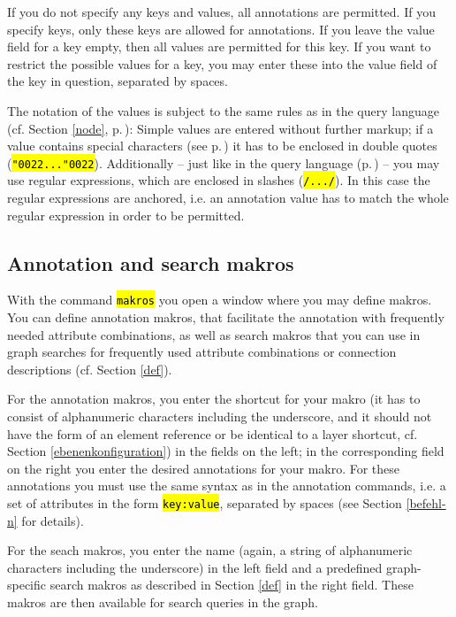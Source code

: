 \documentclass[12pt]{scrartcl}
\newcommand{\quo}{\char"0022}
\newcommand{\code}[1]{\hl{\texttt{#1}}}
\begin{document}
If you do not specify any keys and values, all annotations are permitted.
If you specify keys, only these keys are allowed for annotations.
If you leave the value field for a key empty, then all values are permitted for this key.
If you want to restrict the possible values for a key, you may enter these into the value field of the key in question, separated by spaces.

The notation of the values is subject to the same rules as in the query language (cf. Section \ref{node}, p.\,\pageref{zeichenketten}):
Simple values are entered without further markup; if a value contains special characters (see p.\,\pageref{zeichenketten}) it has to be enclosed in double quotes (\code{\quo...\quo}).
Additionally – just like in the query language (p.\,\pageref{zeichenketten}) – you may use regular expressions, which are enclosed in slashes (\code{/.../}).
In this case the regular expressions are anchored, i.e. an annotation value has to match the whole regular expression in order to be permitted.


\subsection{Annotation and search makros}\label{annotationsmakros}

With the command \code{makros} you open a window where you may define makros.
You can define annotation makros, that facilitate the annotation with frequently needed attribute combinations, as well as search makros that you can use in graph searches for frequently used attribute combinations or connection descriptions (cf. Section \ref{def}).

For the annotation makros, you enter the shortcut for your makro (it has to consist of alphanumeric characters including the underscore, and it should not have the form of an element reference or be identical to a layer shortcut, cf. Section \ref{ebenenkonfiguration}) in the fields on the left; in the corresponding field on the right you enter the desired annotations for your makro.
For these annotations you must use the same syntax as in the annotation commands, i.e. a set of attributes in the form \code{key:value}, separated by spaces (see Section \ref{befehl-n} for details).

For the seach makros, you enter the name (again, a string of alphanumeric characters including the underscore) in the left field and a predefined graph-specific search makros as described in Section \ref{def} in the right field.
These makros are then available for search queries in the graph.
\end{document}

